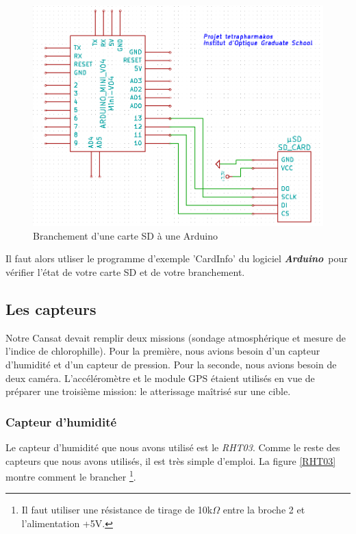 \documentclass[twocolumn, 8pt]{article}
\newcommand\Ard{\textbf{\emph{Arduino}}~}
\begin{document}
\begin{figure}[!h]
	\centering
	\includegraphics[scale=.25]{SD.png}
	\caption{Branchement d'une carte SD à une Arduino}
	\label{SD}
\end{figure}

\par Il faut alors utliser le programme d'exemple \textsf{'CardInfo'} du logiciel \Ard pour vérifier l'état de votre carte SD et de votre branchement.


\subsection{Les capteurs}
\par Notre Cansat devait remplir deux missions (sondage atmosphérique et mesure de l'indice de chlorophille). Pour la première, nous avions besoin d'un capteur d'humidité et d'un capteur de pression. Pour la seconde, nous avions besoin de deux caméra. L'accéléromètre et le module GPS étaient utilisés en vue de préparer une troisième mission: le atterissage maîtrisé sur une cible.

\subsubsection{Capteur d'humidité}
\par Le capteur d'humidité que nous avons utilisé est le \emph{RHT03}. Comme le reste des capteurs que nous avons utilisés, il est très simple d'emploi. La figure \ref{RHT03} montre comment le brancher \footnote{Il faut utiliser une résistance de tirage de 10k$\Omega$ entre la broche \no{}2 et l'alimentation +5V.}.
\end{document}
